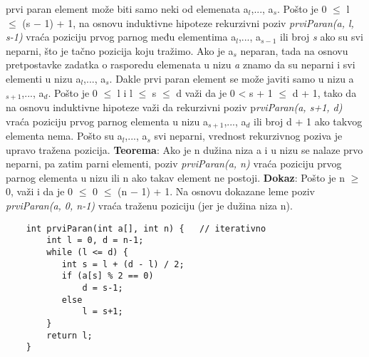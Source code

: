 \documentclass{article}
\begin{document}
prvi paran element može \hspace*{0.8cm}biti samo neki od elemenata a$_l$,..., a$_s$. Pošto je 0 $\leq$ l $\leq$ (s − 1) + 1, na \newline \hspace*{0.8cm}osnovu induktivne hipoteze rekurzivni poziv \textit{prviParan(a, l, s-1)} vraća \hspace*{0.8cm}poziciju prvog 	parnog među elementima a$_l$,..., a$_{s-1}$ ili broj \textit{s} ako su svi \hspace*{0.8cm}neparni, što je tačno pozicija koju 	tražimo. Ako je a$_s$ neparan, tada na \hspace*{0.8cm}osnovu pretpostavke zadatka o rasporedu elemenata u 	nizu \textit{a} znamo da \hspace*{0.8cm}su neparni i svi elementi u nizu a$_l$,..., a$_s$. Dakle prvi paran element se \hspace*{0.8cm}može 	javiti samo u nizu a$_{s+1}$,..., a$_d$. Pošto je 0 $\leq$ l i l $\leq$ s $\leq$ d važi da je \newline \hspace*{0.8cm}0 < s + 1 $\leq$ d + 1, tako da na 	osnovu induktivne hipoteze važi da rekurzivni \hspace*{0.8cm}poziv p\textit{rviParan(a, s+1, d)} vraća poziciju 	prvog parnog elementa u nizu \hspace*{0.8cm}a$_{s+1}$,..., a$_d$ ili broj d + 1 ako takvog elementa nema. Pošto su 	a$_l$,..., a$_s$ svi \hspace*{0.8cm}neparni, vrednost rekurzivnog poziva je upravo tražena pozicija.
\vspace{0.2cm}	\newline \textbf{Teorema}: Ako je n dužina niza a i u nizu se nalaze prvo neparni, pa zatim parni elementi, poziv \textit{prviParan(a, n)} vraća poziciju prvog parnog elementa u nizu ili n ako takav element ne postoji.
\newline \hspace*{0.4cm}\textbf{Dokaz}:
\newline \hspace*{0.8cm}Pošto je n $\geq$ 0, važi i da je 0 $\leq$ 0 $\leq$ (n − 1) + 1. Na osnovu dokazane leme \hspace*{0.8cm}poziv 
\textit{prviParan(a, 0, n-1)} vraća traženu poziciju (jer je dužina niza n).
\newline
\begin{lstlisting}
    int prviParan(int a[], int n) {   // iterativno
		int l = 0, d = n-1; 
		while (l <= d) { 
		   int s = l + (d - l) / 2; 
		   if (a[s] % 2 == 0) 
			   d = s-1; 
		   else 
			   l = s+1;
		} 
		return l;
	}
\end{lstlisting}
\end{document}
